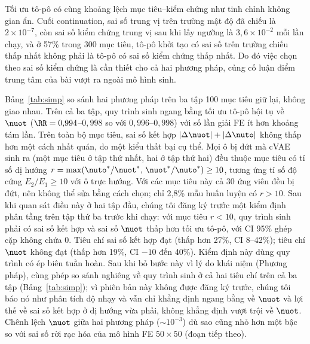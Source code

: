 Tối ưu tô-pô có cùng khoảng lệch mục tiêu--kiểm chứng như tinh chỉnh không
gian ẩn. Cuối continuation, sai số trung vị trên trường mật độ đã chiếu là
$2\times10^{-7}$, còn sai số kiểm chứng trung vị sau khi lấy ngưỡng là
$3{,}6\times10^{-2}$ mỗi lần chạy, và ở 57\% trong 300 mục tiêu, tô-pô khởi
tạo có sai số trên trường chiếu thấp nhất không phải là tô-pô có sai số kiểm
chứng thấp nhất. Do đó việc chọn theo sai số kiểm chứng là cần thiết cho cả
hai phương pháp, củng cố luận điểm trung tâm của bài vượt ra ngoài mô hình
sinh.

Bảng~\ref{tab:simp} so sánh hai phương pháp trên ba tập 100 mục tiêu giữ lại,
không giao nhau. Trên cả ba tập, quy trình sinh ngang bằng tối ưu tô-pô hội
tụ về $\nuot$ ($\RR=0{,}994$--$0{,}998$ so với $0{,}996$--$0{,}998$) với số lần
giải FE ít hơn khoảng tám lần. Trên toàn bộ mục tiêu, sai số kết hợp
$|\Delta\nuot|+|\Delta\nuto|$ không thấp hơn một cách nhất quán, do một kiểu
thất bại cụ thể. Mọi ô bị đứt mà cVAE sinh ra (một mục tiêu ở tập thứ nhất,
hai ở tập thứ hai) đều thuộc mục tiêu có tỉ số dị hướng
$r=\max(\nuto^{*}/\nuot^{*},\,\nuot^{*}/\nuto^{*})\ge10$, tương ứng tỉ số độ
cứng $E_2/E_1\ge10$ với ô trực hướng. Với các mục tiêu này cả 30 ứng viên
đều bị đứt, nên không thể sửa bằng cách chọn; chỉ 2,8\% mẫu huấn luyện có
$r>10$. Sau khi quan sát điều này ở hai tập đầu, chúng tôi đăng ký trước một
kiểm định phân tầng trên tập thứ ba trước khi chạy: với mục tiêu $r<10$, quy
trình sinh phải có sai số kết hợp và sai số $\nuot$ thấp hơn tối ưu tô-pô, với
CI 95\% ghép cặp không chứa 0. Tiêu chí sai số kết hợp đạt (thấp hơn 27\%, CI
8--42\%); tiêu chí $\nuot$ không đạt (thấp hơn 19\%, CI $-10$ đến 40\%). Kiểm định
này dùng quy trình có ép biên tuần hoàn. Sau khi bỏ bước này vì lý do khái
niệm (Phương pháp), cùng phép so sánh nghiêng về quy trình sinh ở cả hai tiêu
chí trên cả ba tập (Bảng~\ref{tab:simp}); vì phiên bản này không được đăng ký
trước, chúng tôi báo nó như phân tích độ nhạy và vẫn chỉ khẳng định ngang
bằng về $\nuot$ và lợi thế về sai số kết hợp ở dị hướng vừa phải, không khẳng
định vượt trội về $\nuot$. Chênh lệch
$\nuot$ giữa hai phương pháp ($\sim\!10^{-3}$) dù sao cũng nhỏ hơn một bậc so
với sai số rời rạc hóa của mô hình FE $50\times50$ (đoạn tiếp theo).

